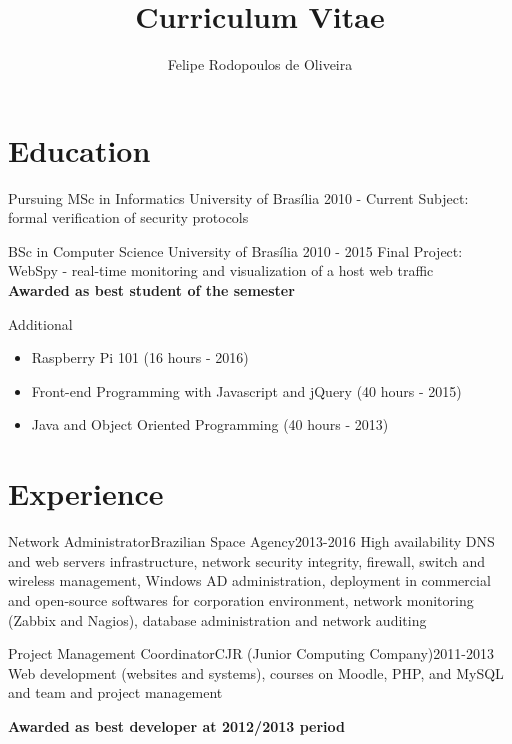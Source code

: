 \documentclass{cv}
\title{Curriculum Vitae}
\author{Felipe Rodopoulos de Oliveira}
\begin{document}
  \maketitle

  \section{Education}
  \begin{chronoitem}
    {Pursuing MSc in Informatics} {University of Brasília} {2010 - Current}
    Subject: formal verification of security protocols
  \end{chronoitem}

  \begin{chronoitem}
    {BSc in Computer Science} {University of Brasília} {2010 - 2015}
    Final Project: WebSpy - real-time monitoring and visualization of a host web traffic \\
    \textbf{Awarded as best student of the semester}
  \end{chronoitem}

  \begin{chronoitem}
    {Additional}{}{}
    \begin{itemize}
      \item[] Raspberry Pi 101 \hfill (16 hours - 2016)
      \item[] Front-end Programming with Javascript and jQuery \hfill (40 hours - 2015)
      \item[] Java and Object Oriented Programming \hfill (40 hours - 2013)
    \end{itemize}
  \end{chronoitem}
  \vspace{-.5cm}

  \section{Experience}
  \begin{chronoitem}
    {Network Administrator}{Brazilian Space Agency}{2013-2016}
    High availability DNS and web servers infrastructure, network security integrity, firewall, switch and wireless management, Windows AD administration, deployment in commercial and open-source softwares for corporation environment, network monitoring (Zabbix and Nagios), database administration and network auditing
  \end{chronoitem}

  \begin{chronoitem}
    {Project Management Coordinator}{CJR (Junior Computing Company)}{2011-2013}
    Web development (websites and systems), courses on Moodle, PHP, and MySQL and team and project management \par
    \textbf{Awarded as best developer at 2012/2013 period}
  \end{chronoitem}
  \vspace{-.5cm}
\end{document}

